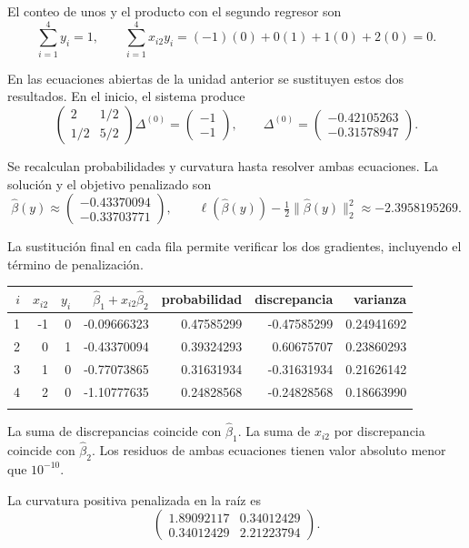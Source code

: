 \documentclass[11pt,a4paper]{article}
\begin{document}
El conteo de unos y el producto con el segundo regresor son
\[
\sum_{i=1}^4 y_i=1,\qquad\sum_{i=1}^4x_{i2}y_i=(-1)(0)+0(1)+1(0)+2(0)=0.
\]

En las ecuaciones abiertas de la unidad anterior se sustituyen
estos dos resultados. En el inicio, el sistema produce
\[
\begin{pmatrix}2&1/2\\1/2&5/2\end{pmatrix}\Delta^{(0)}=\begin{pmatrix}-1\\-1\end{pmatrix},\qquad\Delta^{(0)}=\begin{pmatrix}-0.42105263\\-0.31578947\end{pmatrix}.
\]

Se recalculan probabilidades y curvatura hasta resolver
ambas ecuaciones. La solución y el objetivo penalizado son
\[
\widehat\beta(y)\approx\begin{pmatrix}-0.43370094\\-0.33703771\end{pmatrix},\qquad \ell(\widehat\beta(y))-\tfrac12\|\widehat\beta(y)\|_2^2\approx-2.3958195269.
\]

La sustitución final en cada fila permite verificar
los dos gradientes, incluyendo el término de penalización.
\begin{center}\scriptsize
\begin{tabular}{rrrrrrr}\toprule
\(i\)&\(x_{i2}\)&\(y_i\)&\(\widehat\beta_1+x_{i2}\widehat\beta_2\)&probabilidad&discrepancia&varianza\\\midrule
1&-1&0&-0.09666323&0.47585299&-0.47585299&0.24941692\\
2&0&1&-0.43370094&0.39324293&0.60675707&0.23860293\\
3&1&0&-0.77073865&0.31631934&-0.31631934&0.21626142\\
4&2&0&-1.10777635&0.24828568&-0.24828568&0.18663990\\
\\\bottomrule\end{tabular}\end{center}
La suma de discrepancias coincide con \(\widehat\beta_1\).
La suma de \(x_{i2}\) por discrepancia coincide con
\(\widehat\beta_2\). Los residuos de ambas ecuaciones
tienen valor absoluto menor que \(10^{-10}\).

La curvatura positiva penalizada en la raíz es
\[
\begin{pmatrix}1.89092117&0.34012429\\0.34012429&2.21223794\end{pmatrix}.
\]
\end{document}

